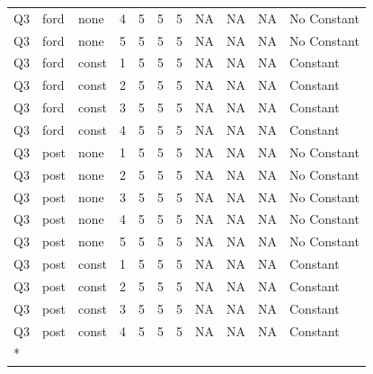 \begin{longtable}[t]{lllrrrrllll}
Q3 & ford & none & 4 & 5 & 5 & 5 & NA & NA & NA & No Constant\\
Q3 & ford & none & 5 & 5 & 5 & 5 & NA & NA & NA & No Constant\\
Q3 & ford & const & 1 & 5 & 5 & 5 & NA & NA & NA & Constant\\
\addlinespace
Q3 & ford & const & 2 & 5 & 5 & 5 & NA & NA & NA & Constant\\
Q3 & ford & const & 3 & 5 & 5 & 5 & NA & NA & NA & Constant\\
Q3 & ford & const & 4 & 5 & 5 & 5 & NA & NA & NA & Constant\\
Q3 & post & none & 1 & 5 & 5 & 5 & NA & NA & NA & No Constant\\
Q3 & post & none & 2 & 5 & 5 & 5 & NA & NA & NA & No Constant\\
\addlinespace
Q3 & post & none & 3 & 5 & 5 & 5 & NA & NA & NA & No Constant\\
Q3 & post & none & 4 & 5 & 5 & 5 & NA & NA & NA & No Constant\\
Q3 & post & none & 5 & 5 & 5 & 5 & NA & NA & NA & No Constant\\
Q3 & post & const & 1 & 5 & 5 & 5 & NA & NA & NA & Constant\\
Q3 & post & const & 2 & 5 & 5 & 5 & NA & NA & NA & Constant\\
\addlinespace
Q3 & post & const & 3 & 5 & 5 & 5 & NA & NA & NA & Constant\\
Q3 & post & const & 4 & 5 & 5 & 5 & NA & NA & NA & Constant\\*
\end{longtable}
\endgroup{}

